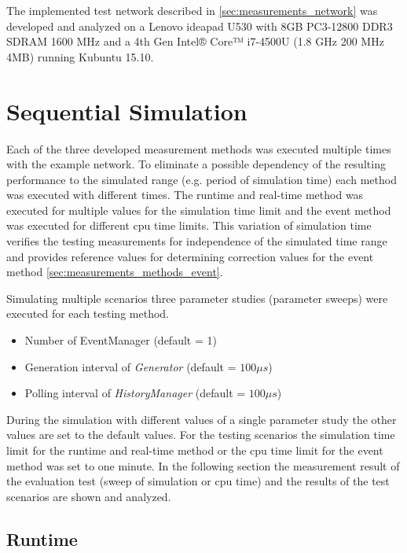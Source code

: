 The implemented test network described in \ref{sec:measurements_network} was developed and analyzed on a Lenovo ideapad U530 with 8GB PC3-12800 DDR3 SDRAM 1600 MHz and a 4th Gen Intel® Core™ i7-4500U (1.8 GHz 200 MHz 4MB) running Kubuntu 15.10.
\cite{lenovo_spec}

\section{Sequential Simulation}
\label{sec:measurements_sequential}
Each of the three developed measurement methods was executed multiple times with the example network.
To eliminate a possible dependency of the resulting performance to the simulated range (e.g. period of simulation time) each method was executed with different times.
The runtime and real-time method was executed for multiple values for the simulation time limit and the event method was executed for different cpu time limits.
This variation of simulation time verifies the testing measurements for independence of the simulated time range and provides reference values for determining correction values for the event method \ref{sec:measurements_methods_event}.

Simulating multiple scenarios three parameter studies (parameter sweeps) were executed for each testing method.

\begin{itemize}
    \item Number of EventManager (default = 1)
    \item Generation interval of \emph{Generator} (default = $100\mu s$)
    \item Polling interval of \emph{HistoryManager} (default = $100\mu s$)
\end{itemize}

During the simulation with different values of a single parameter study the other values are set to the default values.
For the testing scenarios the simulation time limit for the runtime and real-time method or the cpu time limit for the event method was set to one minute.
In the following section the measurement result of the evaluation test (sweep of simulation or cpu time) and the results of the test scenarios are shown and analyzed.

\subsection{Runtime}
\label{sec:measurements_sequential_runtime}

